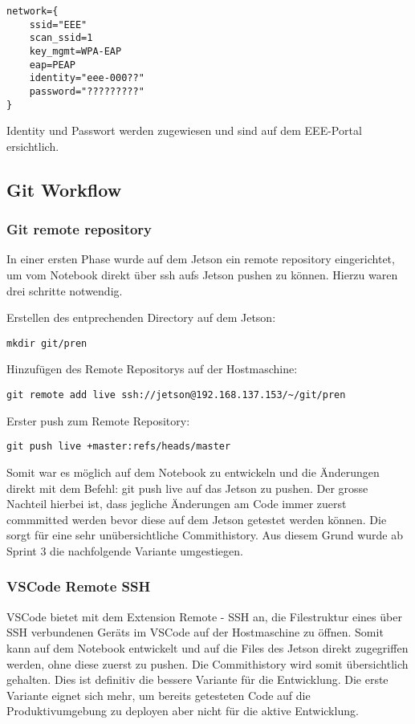 \begin{verbatim}
network={
    ssid="EEE"
    scan_ssid=1
    key_mgmt=WPA-EAP
    eap=PEAP
    identity="eee-000??"
    password="?????????"
}
\end{verbatim}

Identity und Passwort werden zugewiesen und sind auf dem EEE-Portal ersichtlich.

\subsection{Git Workflow}
\subsubsection{Git remote repository}
In einer ersten Phase wurde auf dem Jetson ein remote repository eingerichtet, um vom Notebook direkt über ssh aufs Jetson pushen zu können. Hierzu waren drei schritte notwendig.

Erstellen des entprechenden Directory auf dem Jetson:
\begin{verbatim}
mkdir git/pren
\end{verbatim}


Hinzufügen des Remote Repositorys auf der Hostmaschine:
\begin{verbatim}
git remote add live ssh://jetson@192.168.137.153/~/git/pren
\end{verbatim}


Erster push zum Remote Repository:
\begin{verbatim}
git push live +master:refs/heads/master
\end{verbatim}


Somit war es möglich auf dem Notebook zu entwickeln und die Änderungen direkt mit dem Befehl: git push live auf das Jetson zu pushen. Der grosse Nachteil hierbei ist, dass jegliche Änderungen am Code immer zuerst commmitted werden bevor diese auf dem Jetson getestet werden können. Die sorgt für eine sehr unübersichtliche Commithistory. Aus diesem Grund wurde ab Sprint 3 die nachfolgende Variante umgestiegen.

\subsubsection{VSCode Remote SSH}
VSCode bietet mit dem Extension Remote - SSH \cite{VSCode-Remote-SSH} an, die Filestruktur eines über SSH verbundenen Geräts im VSCode auf der Hostmaschine zu öffnen. Somit kann auf dem Notebook entwickelt und auf die Files des Jetson direkt zugegriffen werden, ohne diese zuerst zu pushen. Die Commithistory wird somit übersichtlich gehalten. Dies ist definitiv die bessere Variante für die Entwicklung. Die erste Variante eignet sich mehr, um bereits getesteten Code auf die Produktivumgebung zu deployen aber nicht für die aktive Entwicklung.